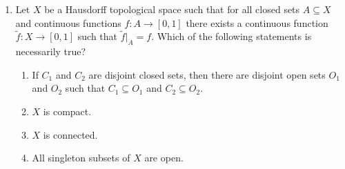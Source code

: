 \documentclass[11pt, a4paper]{article}
\begin{document}
\begin{enumerate}
\item Let $X$ be a Hausdorff topological space such that for all closed sets $A\subseteq X$ and continuous functions $f:A\to[0,1]$ there exists a continuous function $\tilde f:X\to[0,1]$ such that $\tilde f|_A=f$. Which of the following statements is necessarily true?
\begin{enumerate}[label=(\alph*)]
\item If $C_1$ and $C_2$ are disjoint closed sets, then there are disjoint open sets $O_1$ and $O_2$ such that $C_1\subseteq O_1$ and $C_2\subseteq O_2$.
\item $X$ is compact.
\item $X$ is connected.
\item All singleton subsets of $X$ are open.
\end{enumerate}
\end{enumerate}
\end{document}

